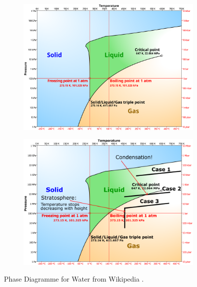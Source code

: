 \begin{figure}[H]
    \centering
    \begin{subfigure}{0.45\linewidth}
        \centering
        \includegraphics[width=\linewidth]{Figures/Thermodynamics/Phase_diagram_of_water_simplified.svg.png}
    \end{subfigure}
    \begin{subfigure}{0.45\linewidth}
        \centering
        \includegraphics[width=\linewidth]{Figures/Thermodynamics/Phase_diagram_of_water_simplified.png}
    \end{subfigure}
    \caption{Phase Diagramme for Water from Wikipedia \cite{PhaseDiagramme}.}
    \label{Phase Diagramme}
\end{figure}

